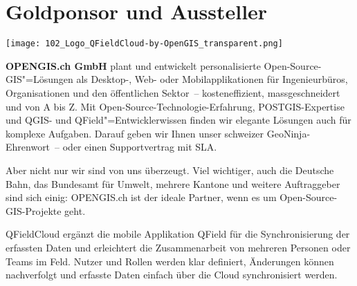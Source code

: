 \section*{Goldponsor und Aussteller}
\begin{flushright}
  \texttt{[image: 102\_Logo\_QFieldCloud-by-OpenGIS\_transparent.png]}
\end{flushright}
\noindent
    {\bfseries OPENGIS.ch GmbH} plant und entwickelt personalisierte Open-Source-GIS"=Lösungen als Desktop-, Web- oder Mobilapplikationen für Ingenieurbüros, Organisationen und den öffentlichen Sektor~-- kosteneffizient, massgeschneidert und von A bis Z. Mit Open-Source-Technologie-Erfahr\-ung, POSTGIS-Expertise und QGIS- und QField"=Entwicklerwissen finden wir elegante Lösungen auch für komplexe Aufgaben. Darauf geben wir Ihnen unser schweizer GeoNinja-Ehrenwort~-- oder einen Supportvertrag mit SLA.
    
\noindent
Aber nicht nur wir sind von uns überzeugt. Viel wichtiger, auch die Deutsche Bahn, das Bundesamt für Umwelt, mehrere Kantone und weitere Auftraggeber sind sich einig: OPENGIS.ch ist der ideale Partner, wenn es um Open-Source-GIS-Projekte geht.

\noindent
QFieldCloud ergänzt die mobile Applikation QField für die Synchronisierung der erfassten Daten und erleichtert die Zusammenarbeit von mehreren Personen oder Teams im Feld. Nutzer und Rollen werden klar definiert, Änderungen können nachverfolgt und erfasste Daten einfach über die Cloud synchronisiert werden.
